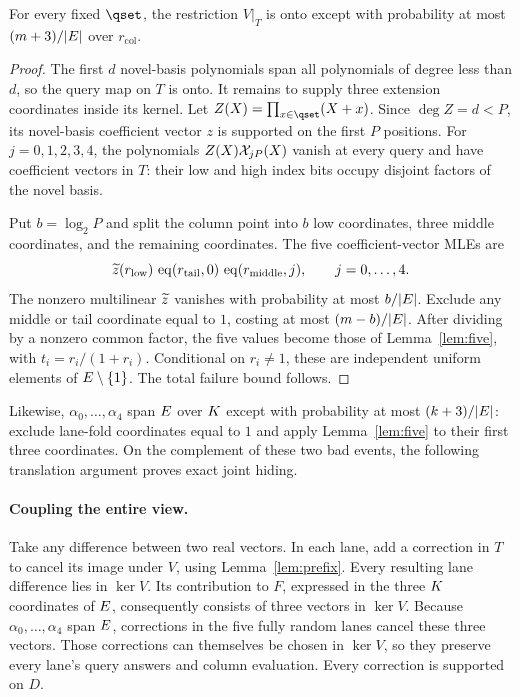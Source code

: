 \begin{lemma}\label{lem:prefix}
For every fixed $\qset$, the restriction $V|_T$ is onto except with probability at most $(m+3)/|E|$ over $r_{\mathrm{col}}$.
\end{lemma}
\begin{proof}
The first $d$ novel-basis polynomials span all polynomials of degree less than $d$, so the query map on $T$ is onto. It remains to supply three extension coordinates inside its kernel. Let $Z(X)=\prod_{x\in\qset}(X+x)$. Since $\deg Z=d<P$, its novel-basis coefficient vector $z$ is supported on the first $P$ positions. For $j=0,1,2,3,4$, the polynomials $Z(X)\mathcal{X}_{jP}(X)$ vanish at every query and have coefficient vectors in $T$: their low and high index bits occupy disjoint factors of the novel basis.

Put $b=\log_2 P$ and split the column point into $b$ low coordinates, three middle coordinates, and the remaining coordinates. The five coefficient-vector MLEs are
\[
 \widetilde{z}(r_{\mathrm{low}})\,
 \operatorname{eq}(r_{\mathrm{tail}},0)\,
 \operatorname{eq}(r_{\mathrm{middle}},j),\qquad j=0,\ldots,4.
\]
The nonzero multilinear $\widetilde{z}$ vanishes with probability at most $b/|E|$. Exclude any middle or tail coordinate equal to $1$, costing at most $(m-b)/|E|$. After dividing by a nonzero common factor, the five values become those of Lemma~\ref{lem:five}, with $t_i=r_i/(1+r_i)$. Conditional on $r_i\ne1$, these are independent uniform elements of $E\setminus\{1\}$. The total failure bound follows.
\end{proof}

Likewise, $\alpha_0,\ldots,\alpha_4$ span $E$ over $K$ except with probability at most $(k+3)/|E|$: exclude lane-fold coordinates equal to $1$ and apply Lemma~\ref{lem:five} to their first three coordinates. On the complement of these two bad events, the following translation argument proves exact joint hiding.

\paragraph{Coupling the entire view.} Take any difference between two real vectors. In each lane, add a correction in $T$ to cancel its image under $V$, using Lemma~\ref{lem:prefix}. Every resulting lane difference lies in $\ker V$. Its contribution to $F$, expressed in the three $K$ coordinates of $E$, consequently consists of three vectors in $\ker V$. Because $\alpha_0,\ldots,\alpha_4$ span $E$, corrections in the five fully random lanes cancel these three vectors. Those corrections can themselves be chosen in $\ker V$, so they preserve every lane's query answers and column evaluation. Every correction is supported on $D$.

